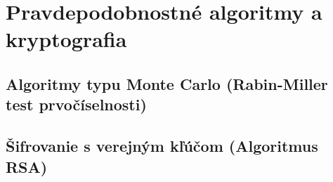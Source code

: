 \documentclass[../main.tex]{subfiles}
\begin{document}
\section{Pravdepodobnostné algoritmy a kryptografia}
\subsection{Algoritmy typu Monte Carlo (Rabin-Miller test prvočíselnosti)}
\subsection{Šifrovanie s verejným kľúčom (Algoritmus RSA)}
\end{document}
